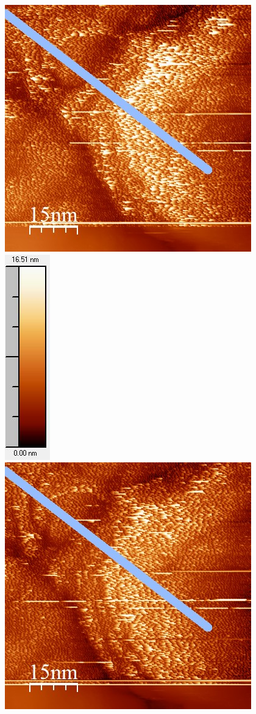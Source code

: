 \documentclass[12pt,a4paper]{article}
\begin{document}
\begin{figure}
\centering
\includegraphics[scale=0.6]{Bilder/Anhang/IGain/11000_IGain_vor.jpg}
\includegraphics[scale=0.6]{Bilder/Anhang/IGain/11000_IGain_vor_Skala.jpg}
\includegraphics[scale=0.6]{Bilder/Anhang/IGain/11000_IGain_nach.jpg}

\end{figure}
\end{document}
